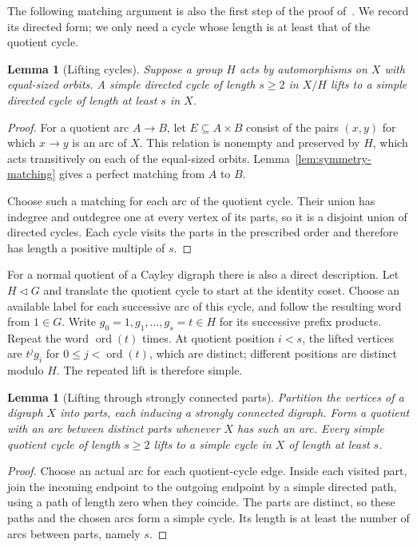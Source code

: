 \documentclass[11pt,a4paper,reqno]{amsart}
\newtheorem{lemma}[theorem]{Lemma}
\theoremstyle{definition}
\theoremstyle{remark}
\numberwithin{equation}{section}
\DeclareMathOperator{\ord}{ord}
\begin{document}
The following matching argument is also the first step of the proof of~\cite[Lemma 3.3]{MaZhaoLinear}. We record its directed form; we only need a cycle whose length is at least that of the quotient cycle.
\begin{lemma}[Lifting cycles]\label{lem:cyclelift}
Suppose a group $H$ acts by automorphisms on $X$ with equal-sized orbits. A simple directed cycle of length $s\ge2$ in $X/H$ lifts to a simple directed cycle of length at least $s$ in $X$.
\end{lemma}
\begin{proof}
For a quotient arc $A\to B$, let $E\subseteq A\times B$ consist of the pairs $(x,y)$ for which $x\to y$ is an arc of $X$. This relation is nonempty and preserved by $H$, which acts transitively on each of the equal-sized orbits. Lemma~\ref{lem:symmetry-matching} gives a perfect matching from $A$ to $B$.

Choose such a matching for each arc of the quotient cycle. Their union has indegree and outdegree one at every vertex of its parts, so it is a disjoint union of directed cycles. Each cycle visits the parts in the prescribed order and therefore has length a positive multiple of $s$.
\end{proof}

For a normal quotient of a Cayley digraph there is also a direct description. Let $H\lhd G$ and translate the quotient cycle to start at the identity coset. Choose an available label for each successive arc of this cycle, and follow the resulting word from $1\in G$. Write $g_0=1,g_1,\ldots,g_s=t\in H$ for its successive prefix products. Repeat the word $\ord(t)$ times. At quotient position $i<s$, the lifted vertices are $t^j g_i$ for $0\le j<\ord(t)$, which are distinct; different positions are distinct modulo $H$. The repeated lift is therefore simple.

\begin{lemma}[Lifting through strongly connected parts]\label{lem:blocklift}
Partition the vertices of a digraph $X$ into parts, each inducing a strongly connected digraph. Form a quotient with an arc between distinct parts whenever $X$ has such an arc. Every simple quotient cycle of length $s\ge2$ lifts to a simple cycle in $X$ of length at least $s$.
\end{lemma}
\begin{proof}
Choose an actual arc for each quotient-cycle edge. Inside each visited part, join the incoming endpoint to the outgoing endpoint by a simple directed path, using a path of length zero when they coincide. The parts are distinct, so these paths and the chosen arcs form a simple cycle. Its length is at least the number of arcs between parts, namely $s$.
\end{proof}
\end{document}

